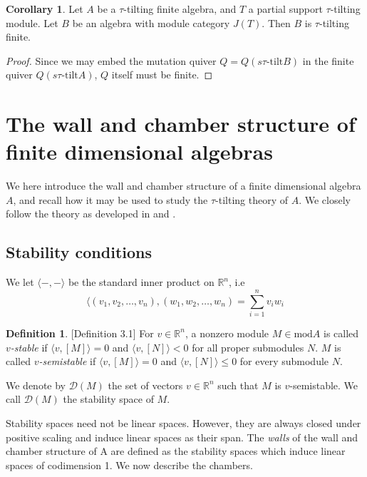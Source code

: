 \documentclass[]{article}
\theoremstyle{definition}
\newtheorem{definition}{Definition}[section]
\newtheorem{corollary}{Corollary}[section]
\newcommand{\tu}{\ensuremath{\tau}}
\begin{document}
\begin{corollary}
	Let $A$ be a \tu-tilting finite algebra, and $T$ a partial support \tu-tilting module. Let $B$ be an algebra with module category $J(T)$. Then $B$ is \tu-tilting finite.
\end{corollary}

\begin{proof}
	Since we may embed the mutation quiver $Q = Q(s\tu\text{-tilt} B)$ in the finite quiver $Q(s\tu\text{-tilt} A)$, $Q$ itself must be finite.
\end{proof}


\section{The wall and chamber structure of finite dimensional algebras}
We here introduce the wall and chamber structure of a finite dimensional algebra $A$, and recall how it may be used to study the \tu-tilting theory of $A$. We closely follow the theory as developed in \cite{Br_stle_2019} and \cite{dij17}.

\subsection{Stability conditions}

We let $\langle -,-\rangle$ be the standard inner product on $\mathbb{R}^n$, i.e \[\langle (v_1,v_2,\dots,v_n),(w_1,w_2,\dots,w_n) = \sum_{i = 1}^{n}v_iw_i\]

\begin{definition}\cite{Br_stle_2019}[Definition 3.1]
	For $v \in \mathbb{R}^n$, a nonzero module $M \in \text{mod} A$ is called \textit{$v$-stable} if $\langle v,[M]\rangle = 0$ and $\langle v,[N]\rangle < 0$ for all proper submodules $N$. $M$ is called \textit{$v$-semistable} if $\langle v, [M]\rangle = 0$ and $\langle v, [N]\rangle \leq 0$ for every submodule $N$.
\end{definition}

We denote by $\mathcal{D}(M)$ the set of vectors $v \in \mathbb{R}^n$ such that $M$ is $v$-semistable. We call $\mathcal{D}(M)$ the stability space of $M$.


Stability spaces need not be linear spaces. However, they are always closed under positive scaling and induce linear spaces as their span. The \textit{walls} of the wall and chamber structure of A are defined as the stability spaces which induce linear spaces of codimension 1. We now describe the chambers.
\end{document}
